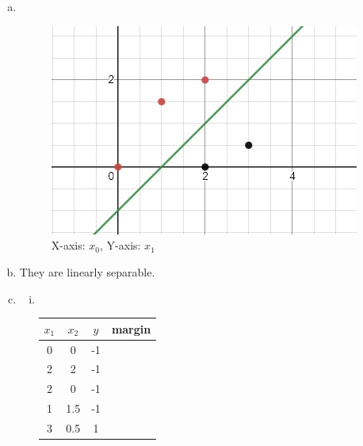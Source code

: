 \documentclass[12pt]{article}
\title{} %
\author{Liheng Cao} %
\date{\today} %
\begin{document}
\maketitle

\section{}
\begin{enumerate}[(a)]
	\item \,\begin{figure}[H]
		\centering
		\includegraphics{images/1a.png}
		\caption{X-axis: $x_0$, Y-axis: $ x_1 $}
		\label{fig:1:a}
	\end{figure}

	\item They are linearly separable.
	
	\item
		\begin{enumerate}[i.]
			\item\,
			\begin{table}[H]
				\centering
					\begin{tabular}{|c|c|c|c|}
					\hline 
					$x_1$ & $ x_2 $ & $ y $ & margin\\\hline
					\hline
					0 & 0 & -1 \\\hline
					2 & 2 & -1\\\hline
					2 & 0 & -1\\\hline
					1 & 1.5 & -1 \\\hline
					3 & 0.5 & 1 \\\hline				
				\end{tabular}
			\end{table}
			
		
		\end{enumerate}
\end{enumerate}
\end{document}

